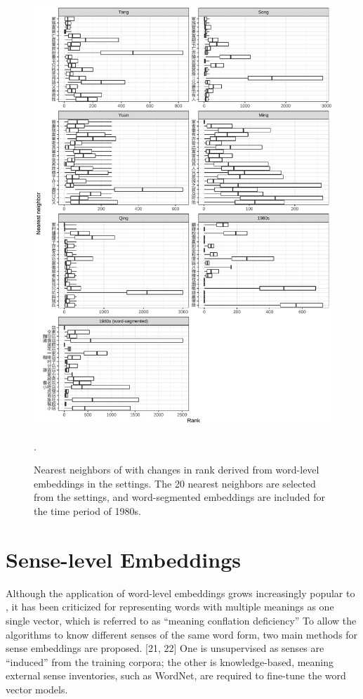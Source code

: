 \newpage
\begin{figure}[H]
  \centering
  \includegraphics[height=0.85\textheight,keepaspectratio]{figures_new/bootstrap_for_stability/neighbor_rank_change.pdf}
  \caption{Nearest neighbors of \jia with changes in rank derived from word-level embeddings in the  settings. The 20 nearest neighbors are selected from the  settings, and word-segmented embeddings are included for the time period of 1980s.} \label{fig:bootstrap_rank}.
\end{figure}

\section{Sense-level Embeddings}
Although the application of word-level embeddings grows increasingly popular to , it has been criticized for representing words with multiple meanings as one single vector, which is referred to as ``meaning conflation deficiency'' \parencite{camacho2018survey} To allow the algorithms to know different senses of the same word form, two main methods for sense embeddings are proposed. [21, 22] One is unsupervised as senses are ``induced'' from the training corpora; the other is knowledge-based, meaning external sense inventories, such as WordNet, are required to fine-tune the word vector models.

